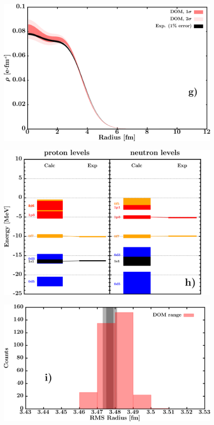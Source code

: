 \documentclass[twocolumn,secnumarabic,amssymb, nobibnotes, aps, prl,
superscriptaddress, nobalancelastpage, draft]{revtex4}
\begin{document}
\begin{figure}[!htb]
\begin{minipage}{0.4\linewidth}
        \includegraphics[width=\linewidth]{figures/ca48_chargeDensity.png}
        \label{DOM_ca48_chargeDensity}
    \end{minipage}\hspace{6pt}
    \begin{minipage}{0.4\linewidth}
        \centering
        \includegraphics[width=\linewidth]{figures/ca48_SPLevels.png}
        \label{DOM_ca48_SPLevels}
    \end{minipage}
    \begin{minipage}{0.4\linewidth}
        \centering
        \includegraphics[width=\linewidth]{figures/ca48_RMSRadius.png}

\end{minipage}
\end{figure}
\end{document}
